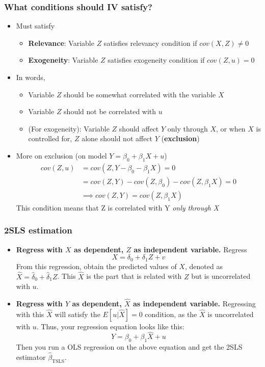 \documentclass[aspectratio=169]{beamer}
\begin{document}
\begin{frame}
\frametitle{What conditions should IV satisfy?}
\begin{itemize}
\item Must satisfy
\begin{itemize}
\item\textbf{Relevance}: Variable $Z$ satisfies relevancy condition if $cov(X,Z)\neq0$
\item\textbf{Exogeneity}: Variable $Z$ satisfies exogeneity condition if $cov(Z,u)=0$
\end{itemize}
\item In words, 
\begin{itemize}
\item Variable $Z$ should be somewhat correlated with the variable $X$
\item Variable $Z$ should not be correlated with $u$
\item (For exogeneity): Variable $Z$ should affect $Y$ only through $X$, or when $X$ is controlled for, $Z$ alone should not affect $Y$ (\textbf{exclusion})
\end{itemize}
\item More on exclusion (on model $Y=\beta_0+\beta_1X+u$)
\[
\begin{aligned}
cov(Z,u)&=cov(Z,Y-\beta_0-\beta_1X)=0\\
&=cov(Z,Y)-cov(Z,\beta_0)-cov(Z,\beta_1X)=0\\
&\implies cov(Z,Y)=cov(Z,\beta_1X)
\end{aligned}
\]
This condition means that Z is correlated with Y \textit{only through X}
\end{itemize}
\end{frame}

\begin{frame}
\frametitle{2SLS estimation}

\begin{itemize}
\item \textbf{Regress with $X$ as dependent, $Z$ as independent variable.} Regress
\[
X=\delta_0 + \delta_1Z+v
\]
From this regression, obtain the predicted values of $X$, denoted as $\hat{X}=\hat{\delta}_0+\hat{\delta}_1Z$. This $\hat{X}$ is the part that is related with $Z$ but is uncorrelated with $u$.
\item \textbf{Regress with $Y$ as dependent, $\hat{X}$ as independent variable.} Regressing with this $\hat{X}$ will satisfy the $E[u|\hat{X}]=0$ condition, as the $\hat{X}$ is uncorrelated with $u$. Thus, your regression equation looks like this:
\[
Y=\beta_0+\beta_1\hat{X}+u
\]
Then you run a OLS regression on the above equation and get the 2SLS estimator $\hat{\beta}_{\text{TSLS}}$. 

\end{itemize}
\end{frame}
\end{document}
